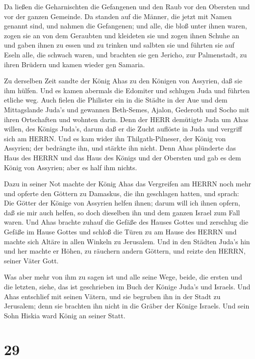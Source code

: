  Da ließen die Geharnischten die Gefangenen und den Raub
vor den Obersten und vor der ganzen Gemeinde.  Da standen
auf die Männer, die jetzt mit Namen genannt sind, und nahmen die
Gefangenen; und alle, die bloß unter ihnen waren, zogen sie an von dem
Geraubten und kleideten sie und zogen ihnen Schuhe an und gaben ihnen zu
essen und zu trinken und salbten sie und führten sie auf Eseln alle, die
schwach waren, und brachten sie gen Jericho, zur Palmenstadt, zu ihren
Brüdern und kamen wieder gen Samaria.

 Zu derselben Zeit sandte der König Ahas zu den Königen von
Assyrien, daß sie ihm hülfen.  Und es kamen abermals die
Edomiter und schlugen Juda und führten etliche weg.  Auch
fielen die Philister ein in die Städte in der Aue und dem Mittagslande
Juda's und gewannen Beth-Semes, Ajalon, Gederoth und Socho mit ihren
Ortschaften und wohnten darin.  Denn der HERR demütigte
Juda um Ahas willen, des Königs Juda's, darum daß er die Zucht auflöste
in Juda und vergriff sich am HERRN.  Und es kam wider ihn
Thilgath-Pilneser, der König von Assyrien; der bedrängte ihn, und
stärkte ihn nicht.  Denn Ahas plünderte das Haus des HERRN
und das Haus des Königs und der Obersten und gab es dem König von
Assyrien; aber es half ihm nichts.

 Dazu in seiner Not machte der König Ahas das Vergreifen am
HERRN noch mehr  und opferte den Göttern zu Damaskus, die
ihn geschlagen hatten, und sprach: Die Götter der Könige von Assyrien
helfen ihnen; darum will ich ihnen opfern, daß sie mir auch helfen, so
doch dieselben ihn und dem ganzen Israel zum Fall waren. 
Und Ahas brachte zuhauf die Gefäße des Hauses Gottes und zerschlug die
Gefäße im Hause Gottes und schloß die Türen zu am Hause des HERRN und
machte sich Altäre in allen Winkeln zu Jerusalem.  Und in
den Städten Juda's hin und her machte er Höhen, zu räuchern andern
Göttern, und reizte den HERRN, seiner Väter Gott.

 Was aber mehr von ihm zu sagen ist und alle seine Wege,
beide, die ersten und die letzten, siehe, das ist geschrieben im Buch
der Könige Juda's und Israels.  Und Ahas entschlief mit
seinen Vätern, und sie begruben ihn in der Stadt zu Jerusalem; denn sie
brachten ihn nicht in die Gräber der Könige Israels. Und sein Sohn
Hiskia ward König an seiner Statt.

\hypertarget{section-28}{%
\section{29}\label{section-28}}

